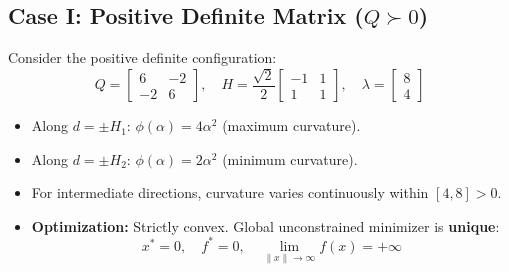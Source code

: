 \subsection{Case I: Positive Definite Matrix (\texorpdfstring{$Q \succ 0$}{Q > 0})}
Consider the positive definite configuration:
\begin{equation}
Q = \begin{bmatrix} 6 & -2 \\ -2 & 6 \end{bmatrix}, \quad H = \frac{\sqrt{2}}{2} \begin{bmatrix} -1 & 1 \\ 1 & 1 \end{bmatrix}, \quad \lambda = \begin{bmatrix} 8 \\ 4 \end{bmatrix}
\end{equation}
\begin{itemize}
    \item Along $d = \pm H_1$: $\phi(\alpha) = 4\alpha^2$ (maximum curvature).
    \item Along $d = \pm H_2$: $\phi(\alpha) = 2\alpha^2$ (minimum curvature).
    \item For intermediate directions, curvature varies continuously within $[4, 8] > 0$.
    \item \textbf{Optimization:} Strictly convex. Global unconstrained minimizer is \textbf{unique}:
    \begin{equation}
    x^* = 0, \quad f^* = 0, \quad \lim_{\|x\| \to \infty} f(x) = +\infty
    \end{equation}
\end{itemize}

